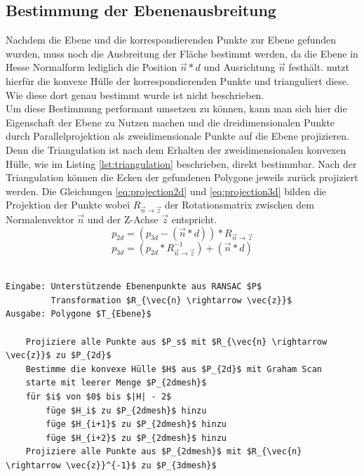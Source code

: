 \subsection{Bestimmung der Ebenenausbreitung}

Nachdem die Ebene und die korrespondierenden Punkte zur Ebene gefunden wurden, muss noch die Ausbreitung der Fläche bestimmt werden, da die Ebene in Hesse Normalform lediglich die Position \(\vec{n} * d\) und Ausrichtung \(\vec{n}\) festhält. \citet{PlanarSurfaceMapping} nutzt hierfür die konvexe Hülle der korrespondierenden Punkte und trianguliert diese. Wie diese dort genau bestimmt wurde ist nicht beschrieben. \\

Um diese Bestimmung performant umsetzen zu können, kann man sich hier die Eigenschaft der Ebene zu Nutzen machen und die dreidimensionalen Punkte durch Parallelprojektion als zweidimensionale Punkte auf die Ebene projizieren. Denn die Triangulation ist nach dem Erhalten der zweidimensionalen konvexen Hülle, wie im Listing \ref{lst:triangulation} beschrieben, direkt bestimmbar. Nach der Triangulation können die Ecken der gefundenen Polygone jeweils zurück projiziert werden. Die Gleichungen \ref{eq:projection2d} und \ref{eq:projection3d} bilden die Projektion der Punkte wobei \(R_{\vec{n} \rightarrow \vec{z}}\) der Rotationsmatrix zwischen dem Normalenvektor \(\vec{n}\) und der Z-Achse \(\vec{z}\) entspricht.\\

\begin{equation} \label{eq:projection2d}
p_{2d} = (p_{3d} - (\vec{n}*d)) * R_{\vec{n} \rightarrow \vec{z}}
\end{equation}
\begin{equation} \label{eq:projection3d}
p_{3d} = (p_{2d} * R_{\vec{n} \rightarrow \vec{z}}^{-1}) + (\vec{n}*d)
\end{equation}

\begin{lstlisting}[mathescape,caption=Bestimmung der Ebenenausbreitung und Triangulation, label=lst:triangulation]

Eingabe: Unterstützende Ebenenpunkte aus RANSAC $P$
         Transformation $R_{\vec{n} \rightarrow \vec{z}}$
Ausgabe: Polygone $T_{Ebene}$

    Projiziere alle Punkte aus $P_s$ mit $R_{\vec{n} \rightarrow \vec{z}}$ zu $P_{2d}$
    Bestimme die konvexe Hülle $H$ aus $P_{2d}$ mit Graham Scan
    starte mit leerer Menge $P_{2dmesh}$
    für $i$ von $0$ bis $|H| - 2$
        füge $H_i$ zu $P_{2dmesh}$ hinzu
        füge $H_{i+1}$ zu $P_{2dmesh}$ hinzu
        füge $H_{i+2}$ zu $P_{2dmesh}$ hinzu
    Projiziere alle Punkte aus $P_{2dmesh}$ mit $R_{\vec{n} \rightarrow \vec{z}}^{-1}$ zu $P_{3dmesh}$
   
\end{lstlisting}


